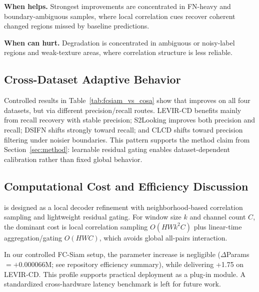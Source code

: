 \noindent\textbf{When \cosa{} helps.} Strongest improvements are concentrated in FN-heavy and boundary-ambiguous samples, where local correlation cues recover coherent changed regions missed by baseline predictions.

\noindent\textbf{When \cosa{} can hurt.} Degradation is concentrated in ambiguous or noisy-label regions and weak-texture areas, where correlation structure is less reliable.

\subsection{Cross-Dataset Adaptive Behavior}
Controlled results in Table~\ref{tab:fcsiam_vs_cosa} show that \cosa{} improves \Fonec{} on all four datasets, but via different precision/recall routes. LEVIR-CD benefits mainly from recall recovery with stable precision; S2Looking improves both precision and recall; DSIFN shifts strongly toward recall; and CLCD shifts toward precision filtering under noisier boundaries. This pattern supports the method claim from Section~\ref{sec:method}: learnable residual gating enables dataset-dependent calibration rather than fixed global behavior.

\subsection{Computational Cost and Efficiency Discussion}
\cosa{} is designed as a local decoder refinement with neighborhood-based correlation sampling and lightweight residual gating. For window size $k$ and channel count $C$, the dominant cost is local correlation sampling $O(HWk^2C)$ plus linear-time aggregation/gating $O(HWC)$, which avoids global all-pairs interaction.

In our controlled FC-Siam setup, the parameter increase is negligible (\(\Delta\)Params \(= +0.000066\)M; see repository efficiency summary), while delivering +1.75 \Fonec{} on LEVIR-CD. This profile supports practical deployment as a plug-in module. A standardized cross-hardware latency benchmark is left for future work.

